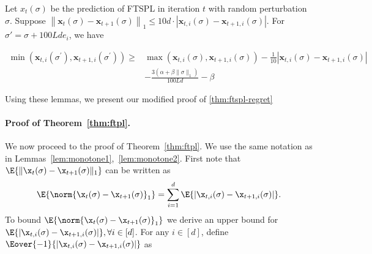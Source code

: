 \begin{lemma}[Monotonicity 2]
    Let $x_t(\sigma)$ be the prediction of FTSPL in iteration $t$ with random perturbation $\sigma$. Suppose $\left\|\mathbf{x}_{t}(\sigma)-\mathbf{x}_{t+1}(\sigma)\right\|_{1} \leq 10 d \cdot\left|\mathbf{x}_{t, i}(\sigma)-\mathbf{x}_{t+1, i}(\sigma)\right|$. For $\sigma' = \sigma + 100Lde_i$, we have

\begin{align*} \min \left(\mathbf{x}_{t, i}\left(\sigma^{\prime}\right), \mathbf{x}_{t+1, i}\left(\sigma^{\prime}\right)\right) \geq & \max \left(\mathbf{x}_{t, i}(\sigma), \mathbf{x}_{t+1, i}(\sigma)\right)-\frac{1}{10}\left|\mathbf{x}_{t, i}(\sigma)-\mathbf{x}_{t+1, i}(\sigma)\right| \\ &-\frac{3\left(\alpha+\beta\|\sigma\|_{1}\right)}{100 L d}-\beta \end{align*}
\end{lemma}

Using these lemmas, we present our modified proof of \ref*{thm:ftspl-regret}

\paragraph{Proof of Theorem~\ref{thm:ftpl}.} We now proceed to the proof of Theorem~\ref{thm:ftpl}. We use the same notation as in Lemmas~\ref{lem:monotone1},~\ref{lem:monotone2}.
First note that $\E{\|\x_t(\sigma)-\x_{t+1}(\sigma)\|_1}$ can be written as
\begin{equation}
    \label{eqn:coordinatewise}
    \E{\norm{\x_t(\sigma)-\x_{t+1}(\sigma)}_1} = \sum_{i = 1}^d \E{|\x_{t,i}(\sigma)-\x_{t+1,i}(\sigma)|}.
\end{equation}
To bound $\E{\norm{\x_t(\sigma)-\x_{t+1}(\sigma)}_1}$ we derive an upper bound for \mbox{$\E{|\x_{t,i}(\sigma) - \x_{t+1,i}(\sigma)|}, \forall i\in [d]$}. For any $i \in [d]$, define $\Eover{-1}{|\x_{t,i}(\sigma) - \x_{t+1,i}(\sigma)|}$ as 

